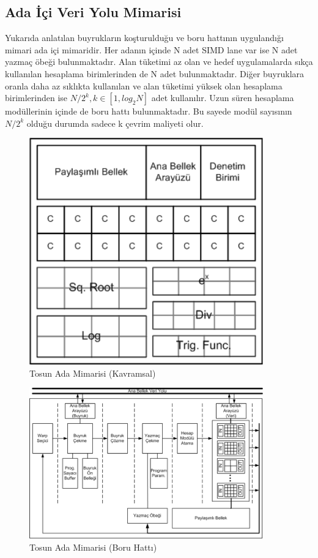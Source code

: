 \subsection{Ada İçi Veri Yolu Mimarisi}

Yukarıda anlatılan buyrukların koşturulduğu ve boru hattının uygulandığı mimari ada içi mimaridir. Her adanın içinde N adet SIMD lane var ise N adet yazmaç öbeği bulunmaktadır. Alan tüketimi az olan ve hedef uygulamalarda sıkça kullanılan hesaplama birimlerinden de N adet bulunmaktadır. Diğer buyruklara oranla daha az sıklıkta kullanılan ve alan tüketimi yüksek olan hesaplama birimlerinden ise $N/2^{k}, k\in[1,log_{2}N]$ adet kullanılır. Uzun süren hesaplama modüllerinin içinde de boru hattı bulunmaktadır. Bu sayede modül sayısının $N/2^{k}$ olduğu durumda sadece k çevrim maliyeti olur.\par
\begin{figure}[h]
\centering
\shorthandoff{=}
\includegraphics[width=0.9\textwidth]{gorsel/adaMimarisiEski.png}
\shorthandoff{=}
\caption{Tosun Ada Mimarisi (Kavramsal)}
\label{image:adaMimarisiEski}
\end{figure}
\begin{figure}[h]
\centering
\shorthandoff{=}
\includegraphics[width=0.9\textwidth]{gorsel/adaMimarisi.png}
\shorthandoff{=}
\caption{Tosun Ada Mimarisi (Boru Hattı)}
\label{image:adaMimarisi}
\end{figure}
